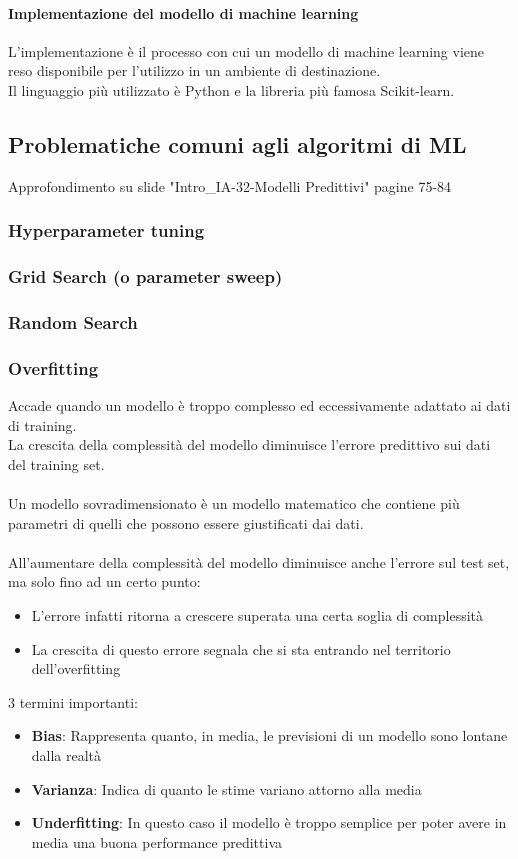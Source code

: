 \documentclass[../main.tex]{subfiles}
\begin{document}
	\paragraph{Implementazione del modello di machine learning} 
	L'implementazione è il processo con cui un modello di machine learning viene reso disponibile per l'utilizzo in un ambiente di destinazione. \\
	Il linguaggio più utilizzato è Python e la libreria più famosa Scikit-learn.
	\subsection{Problematiche comuni agli algoritmi di ML}
	{\color{red}Approfondimento su slide "Intro\_IA-32-Modelli Predittivi" pagine 75-84}
	\subsubsection{Hyperparameter tuning}
	\subsubsection{Grid Search (o parameter sweep)}
	\subsubsection{Random Search}
	\subsubsection{Overfitting}
	Accade quando un modello è troppo complesso ed eccessivamente adattato ai dati di training. \\
	La crescita della complessità del modello diminuisce l’errore predittivo sui dati del training set.\\\\
	Un modello sovradimensionato è un modello matematico che contiene più parametri di quelli che possono essere giustificati dai dati.\\\\
	All'aumentare della complessità del modello diminuisce anche l’errore sul test set, ma solo fino ad un certo punto:
	\begin{itemize}
		\item L’errore infatti ritorna a crescere superata una certa soglia di complessità
		\item La crescita di questo errore segnala che si sta entrando nel territorio dell’overfitting
	\end{itemize}
	3 termini importanti:
	\begin{itemize}
	\item \textbf{Bias}: Rappresenta quanto, in media, le previsioni di un modello sono lontane dalla realtà
	\item \textbf{Varianza}: Indica di quanto le stime variano attorno alla media
	\item \textbf{Underfitting}: In questo caso il modello è troppo semplice per poter avere in media una buona performance predittiva
	\end{itemize}
\end{document}
